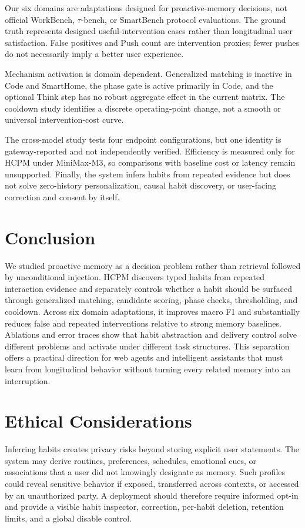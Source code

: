 \documentclass[sigconf,anonymous,review]{acmart}
\newcommand{\system}{HCPM}
\begin{document}
Our six domains are adaptations designed for proactive-memory decisions, not official WorkBench, $\tau$-bench, or SmartBench protocol evaluations.
The ground truth represents designed useful-intervention cases rather than longitudinal user satisfaction.
False positives and Push count are intervention proxies; fewer pushes do not necessarily imply a better user experience.

Mechanism activation is domain dependent.
Generalized matching is inactive in Code and SmartHome, the phase gate is active primarily in Code, and the optional Think step has no robust aggregate effect in the current matrix.
The cooldown study identifies a discrete operating-point change, not a smooth or universal intervention-cost curve.

The cross-model study tests four endpoint configurations, but one identity is gateway-reported and not independently verified.
Efficiency is measured only for \system{} under MiniMax-M3, so comparisons with baseline cost or latency remain unsupported.
Finally, the system infers habits from repeated evidence but does not solve zero-history personalization, causal habit discovery, or user-facing correction and consent by itself.

\section{Conclusion}

We studied proactive memory as a decision problem rather than retrieval followed by unconditional injection.
\system{} discovers typed habits from repeated interaction evidence and separately controls whether a habit should be surfaced through generalized matching, candidate scoring, phase checks, thresholding, and cooldown.
Across six domain adaptations, it improves macro F1 and substantially reduces false and repeated interventions relative to strong memory baselines.
Ablations and error traces show that habit abstraction and delivery control solve different problems and activate under different task structures.
This separation offers a practical direction for web agents and intelligent assistants that must learn from longitudinal behavior without turning every related memory into an interruption.

\section*{Ethical Considerations}

Inferring habits creates privacy risks beyond storing explicit user statements.
The system may derive routines, preferences, schedules, emotional cues, or associations that a user did not knowingly designate as memory.
Such profiles could reveal sensitive behavior if exposed, transferred across contexts, or accessed by an unauthorized party.
A deployment should therefore require informed opt-in and provide a visible habit inspector, correction, per-habit deletion, retention limits, and a global disable control.
\end{document}
